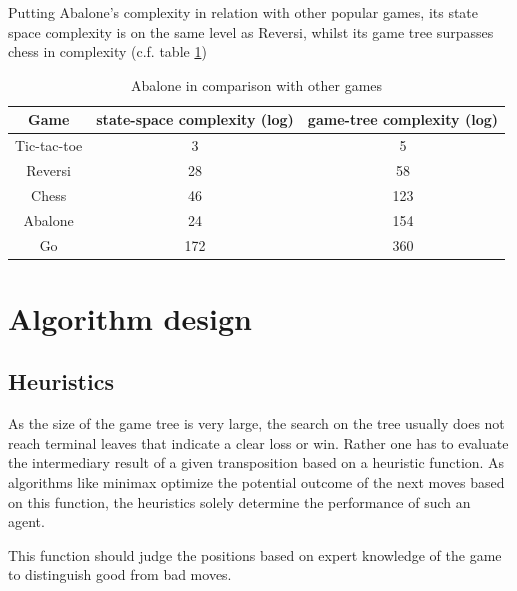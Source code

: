 \documentclass{llncs}
\begin{document}
Putting Abalone's complexity in relation with other popular games, its state space complexity is on the same level as Reversi, whilst its game tree surpasses chess in complexity (c.f. table \ref{complexity_table})

\begin{table}
  \begin{center}
    \begin{tabular}{ | c | c | c | }
      \hline
      Game        & state-space complexity (log) & game-tree complexity (log) \\
      \hline
      Tic-tac-toe & 3                            & 5                          \\
      \hline
      Reversi     & 28                           & 58                         \\
      \hline
      Chess       & 46                           & 123                        \\
      \hline
      Abalone     & 24                           & 154                        \\
      \hline
      Go          & 172                          & 360                        \\
      \hline
    \end{tabular}
  \end{center}
  \caption{Abalone in comparison with other games \cite{chorus_implementing_2009}}
  \label{complexity_table}
\end{table}


\section{Algorithm design}


\subsection{Heuristics}
As the size of the game tree is very large, the search on the tree usually does not reach terminal leaves that indicate a clear loss or win. Rather one has to evaluate the intermediary result of a given transposition based on a heuristic function. As algorithms like minimax optimize the potential outcome of the next moves based on this function, the heuristics solely determine the performance of such an agent.

This function should judge the positions based on expert knowledge of the game to distinguish good from bad moves.
\end{document}
